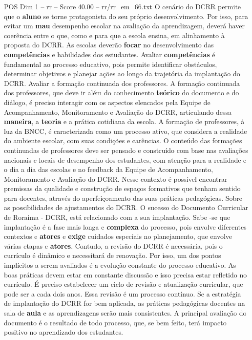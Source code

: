 \begin{textsample}{POS Dim 1 – rr – Score 40.00 – rr/rr\_em\_66.txt}
O cenário do DCRR permite que o \textbf{aluno} se torne protagonista do seu próprio desenvolvimento.
Por isso, para evitar um \textbf{mau} desempenho escolar na avaliação da aprendizagem, deverá haver coerência entre o que, como e para que a escola ensina, em alinhamento à proposta do DCRR.
As escolas deverão \textbf{focar} no desenvolvimento das \textbf{competências} e habilidades dos estudantes.
Avaliar \textbf{competências} é fundamental ao processo educativo, pois permite identificar obstáculos, determinar objetivos e planejar ações ao longo da trajetória da implantação do DCRR.
Avaliar a formação continuada dos professores.
A formação continuada dos professores, que deve ir além do conhecimento \textbf{teórico} do documento e do diálogo, é preciso interagir com os aspectos elencados pela Equipe de Acompanhamento, Monitoramento e Avaliação do DCRR, articulando dessa \textbf{maneira}, a \textbf{teoria} e a prática cotidiana da escola.
A formação de professores, à luz da BNCC, é caracterizada como um processo ativo, que considera a realidade do ambiente escolar, com suas condições e carências.
O conteúdo das formações continuadas de professores deve ser pensado e construído com base nas avaliações nacionais e locais de desempenho dos estudantes, com atenção para a realidade e o dia a dia das escolas e no feedback da Equipe de Acompanhamento, Monitoramento e Avaliação do DCRR.
Nesse contexto é possível encontrar premissas da qualidade e construção de espaços formativos que tenham sentido para docentes, através do aperfeiçoamento das suas práticas pedagógicas.
Sobre as possibilidades de ajustamentos do DCRR.
O sucesso do Documento Curricular de Roraima - DCRR, está relacionado com a sua implantação.
Sabe -se que implantação é a fase mais longa e \textbf{complexa} do processo, pois envolve diferentes contextos e \textbf{atores} e \textbf{exige} cuidados especiais no planejamento, que envolve várias etapas e \textbf{atores}.
Contudo, a revisão do DCRR é necessária, pois o currículo é dinâmico e necessitará de renovação.
Por isso, um dos pontos implícitos a serem avaliados é a evolução constante do processo educativo.
As boas práticas devem estar em constante discussão e isso precisa estar refletido no currículo.
É preciso estabelecer um ciclo de revisão e atualização curricular, que pode ser a cada dois anos.
Essa revisão é um processo contínuo.
Se a estratégia de implantação do DCRR for bem aplicada, as práticas pedagógicas docentes na sala de \textbf{aula} e as aprendizagens serão mais consistentes.
A principal avaliação do documento é o resultado de todo processo, que, se bem feito, terá impacto positivo no aprendizado dos estudantes.

\end{textsample}
